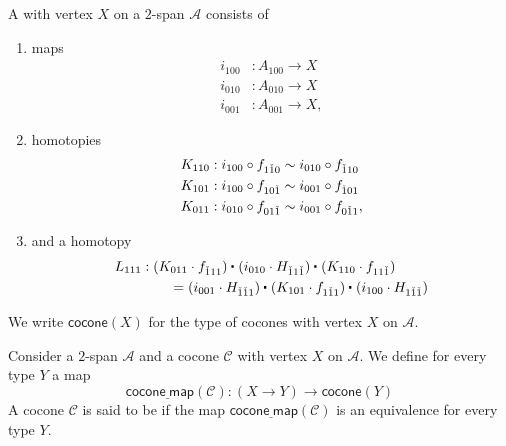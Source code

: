 \begin{defn}
A  with vertex $X$ on a $2$-span $\mathcal{A}$ consists of
\begin{enumerate}
\item maps
\begin{align*}
i_{100} & : A_{100} \to X\\
i_{010} & : A_{010} \to X\\
i_{001} & : A_{001} \to X,
\end{align*}
\item homotopies
\begin{align*}
K_{110} & : i_{100}\circ f_{1\check{1}0} \sim i_{010}\circ f_{\check{1}10} \\
K_{101} & : i_{100}\circ f_{10\check{1}} \sim i_{001}\circ f_{\check{1}01} \\
K_{011} & : i_{010}\circ f_{01\check{1}} \sim i_{001}\circ f_{0\check{1}1},
\end{align*}
\item and a homotopy
\begin{align*}
L_{111} & : \ct{(K_{011}\cdot f_{\check{1}11})}{(i_{010}\cdot H_{\check{1}1\check{1}})}{(K_{110}\cdot f_{11\check{1}})} \\
& \qquad = \ct{(i_{001}\cdot H_{\check{1}\check{1}1})}{(K_{101}\cdot f_{1\check{1}1})}{(i_{100}\cdot H_{1\check{1}\check{1}})}
\end{align*}
\end{enumerate}
We write $\mathsf{cocone}(X)$ for the type of cocones with vertex $X$ on $\mathcal{A}$.
\end{defn}

\begin{defn}
Consider a $2$-span $\mathcal{A}$ and a cocone $\mathcal{C}$ with vertex $X$ on $\mathcal{A}$. We define for every type $Y$ a map
\begin{equation*}
\mathsf{cocone\underline{~}map}(\mathcal{C}) : (X\to Y)\to \mathsf{cocone}(Y)
\end{equation*}
A cocone $\mathcal{C}$ is said to be  if the map $\mathsf{cocone\underline{~}map}(\mathcal{C})$ is an equivalence for every type $Y$.
\end{defn}

